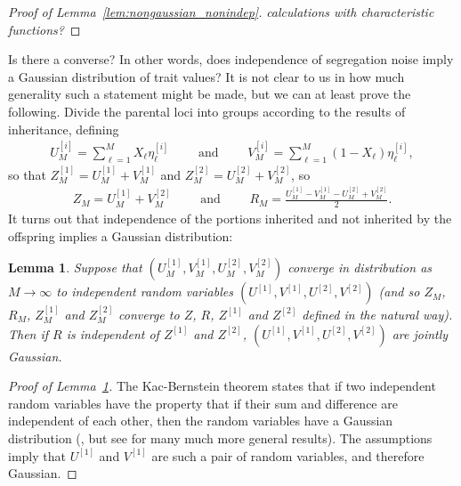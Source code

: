 \documentclass{article}
\newcommand{\comment}[1]{{\color{blue} \it #1}}
\newtheorem{lem}{Lemma}
\theoremstyle{remark}
\theoremstyle{definition}
\begin{document}
\begin{proof}[Proof of Lemma~\ref{lem:nongaussian_nonindep}]
    \comment{calculations with characteristic functions?}
\end{proof}

Is there a converse? In other words,
does independence of segregation noise imply a Gaussian distribution of trait values?
It is not clear to us in how much generality such a statement might be made,
but we can at least prove the following.
Divide the parental loci into groups according to the results of inheritance,
defining
\begin{align*}
    U_M^{[i]} = \sum_{\ell=1}^M X_\ell \eta_\ell^{[i]} 
    \qquad \text{ and } \qquad
    V_M^{[i]} = \sum_{\ell=1}^M (1-X_\ell) \eta_\ell^{[i]} ,
\end{align*}
so that 
$Z_M^{[1]} = U_M^{[1]} + V_M^{[1]}$ and
$Z_M^{[2]} = U_M^{[2]} + V_M^{[2]}$, so
\begin{align*}
    Z_M = U_M^{[1]} + V_M^{[2]} \qquad \text{ and } \qquad
    R_M = \frac{U_M^{[1]} - V_M^{[1]} - U_M^{[2]} + V_M^{[2]}}{ 2 } .
\end{align*}
It turns out that independence of the portions inherited and not inherited by the offspring
implies a Gaussian distribution:

\begin{lem}\label{lem:parental_contribs}
    Suppose that
    $(U_M^{[1]}, V_M^{[1]}, U_M^{[2]}, V_M^{[2]})$ converge in distribution as $M \to \infty$
    to independent random variables $(U^{[1]}, V^{[1]}, U^{[2]}, V^{[2]})$
    (and so $Z_M$, $R_M$, $Z_M^{[1]}$ and $Z_M^{[2]}$ converge to $Z$, $R$, $Z^{[1]}$ and $Z^{[2]}$
    defined in the natural way).
    Then if $R$ is independent of $Z^{[1]}$ and $Z^{[2]}$,
    $(U^{[1]}, V^{[1]}, U^{[2]}, V^{[2]})$ are jointly Gaussian.
\end{lem}

\begin{proof}[Proof of Lemma~\ref{lem:parental_contribs}]
    The Kac-Bernstein theorem states that if two independent random variables
    have the property that if their sum and difference are independent of each other,
    then the random variables have a Gaussian distribution
    (\citet{kac1939characterization,bernstein1941property},
    but see \citet{kagan1973characterization} for many much more general results).
    The assumptions imply that $U^{[1]}$ and $V^{[1]}$
    are such a pair of random variables, and therefore Gaussian.
\end{proof}
\end{document}

